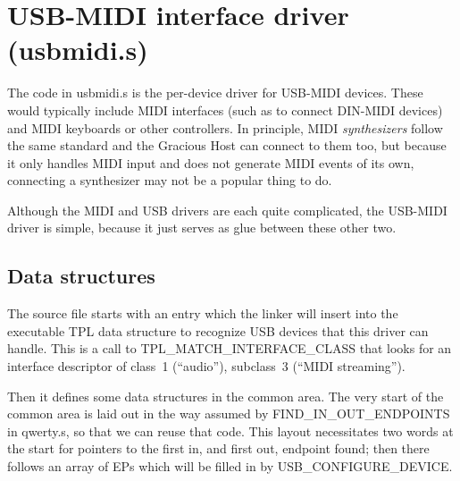 
%
%
%
%
%
%

\chapter{USB-MIDI interface driver (usbmidi.s)}

The code in usbmidi.s is the per-device driver for USB-MIDI devices.  These
would typically include MIDI interfaces (such as to connect DIN-MIDI
devices) and MIDI keyboards or other controllers.  In principle, MIDI
\emph{synthesizers} follow the same standard and the Gracious Host can
connect to them too, but because it only handles MIDI input and does not
generate MIDI events of its own, connecting a synthesizer may not be a
popular thing to do.

Although the MIDI and USB drivers are each quite complicated, the USB-MIDI
driver is simple, because it just serves as glue between these other two.

\section{Data structures}

The source file starts with an entry which the linker will insert into
the executable TPL data structure to recognize USB devices that this driver
can handle.  This is a call to TPL\_MATCH\_INTERFACE\_CLASS that looks for
an interface descriptor of class~1 (``audio''), subclass~3 (``MIDI
streaming'').

Then it defines some data structures in the common area.  The very start of
the common area is laid out in the way assumed by FIND\_IN\_OUT\_ENDPOINTS
in qwerty.s, so that we can reuse that code.  This layout necessitates two
words at the start for pointers to the first in, and first out, endpoint
found; then there follows an array of EPs which will be filled in by
USB\_CONFIGURE\_DEVICE.

